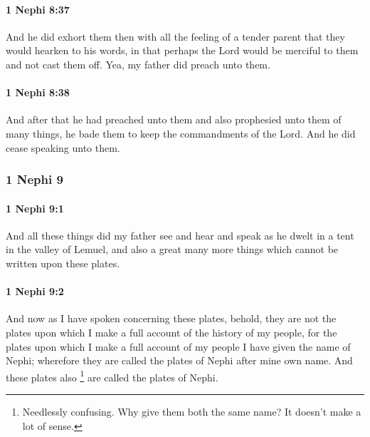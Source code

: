 		\paragraph{1 Nephi 8:37} %
			\label{1NEPHI-8-37}

			And he did exhort them then with all the feeling of a tender parent
			that they would hearken to his words,
			in that perhaps the Lord would be merciful to them and not cast them off.
			Yea, my father did preach unto them.

		\paragraph{1 Nephi 8:38} %
			\label{1NEPHI-8-38}

			And after that he had preached unto them
			and also prophesied unto them of many things,
			he bade them to keep the commandments of the Lord.
			And he did cease speaking unto them.

	\subsubsection{1 Nephi 9} %
		\label{1NEPHI-9}
		
		\paragraph{1 Nephi 9:1} %
			\label{1NEPHI-9-1}

			And all these things did my father see and hear and speak
			as he dwelt in a tent in the valley of Lemuel,
			and also a great many more things which cannot be written upon these plates.

		\paragraph{1 Nephi 9:2} %
			\label{1NEPHI-9-2}

			And now as I have spoken concerning these plates,
			behold, they are not the plates
			upon which I make a full account of the history of my people,
			for the plates upon which I make a full account of my people
			I have given the name of Nephi;
			wherefore they are called the plates of Nephi after mine own name.
			And these plates also%
				\footnote{%
					Needlessly confusing. Why give them both the same name? It doesn't make a lot of sense.
					}
			are called the plates of Nephi.

